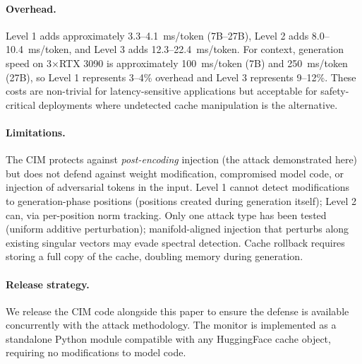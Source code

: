 \paragraph{Overhead.}
Level 1 adds approximately 3.3--4.1~ms/token (7B--27B), Level 2 adds
8.0--10.4~ms/token, and Level 3 adds 12.3--22.4~ms/token. For context,
generation speed on 3$\times$RTX 3090 is approximately 100~ms/token (7B)
and 250~ms/token (27B), so Level 1 represents 3--4\% overhead and
Level 3 represents 9--12\%. These costs are non-trivial for latency-sensitive
applications but acceptable for safety-critical deployments where
undetected cache manipulation is the alternative.

\paragraph{Limitations.}
The CIM protects against \emph{post-encoding} injection (the attack
demonstrated here) but does not defend against weight modification,
compromised model code, or injection of adversarial tokens in the input.
Level 1 cannot detect modifications to generation-phase positions
(positions created during generation itself); Level 2 can, via
per-position norm tracking. Only one attack type has been tested (uniform
additive perturbation); manifold-aligned injection that perturbs along
existing singular vectors may evade spectral detection. Cache rollback
requires storing a full copy of the cache, doubling memory during generation.

\paragraph{Release strategy.}
We release the CIM code alongside this paper to ensure the defense is
available concurrently with the attack methodology. The monitor is
implemented as a standalone Python module compatible with any
HuggingFace cache object, requiring no modifications to model code.
